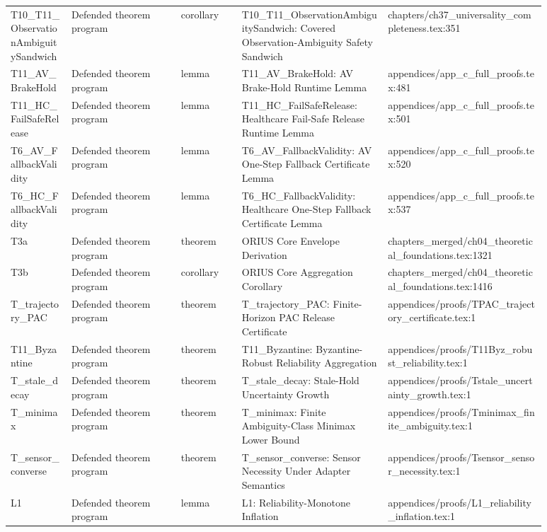 \begin{longtable}{p{0.10\linewidth}p{0.18\linewidth}p{0.10\linewidth}p{0.24\linewidth}p{0.26\linewidth}}
T10\_T11\_ObservationAmbiguitySandwich & Defended theorem program & corollary & T10\_T11\_ObservationAmbiguitySandwich: Covered Observation-Ambiguity Safety Sandwich & chapters/ch37\_universality\_completeness.tex:351 \\
T11\_AV\_BrakeHold & Defended theorem program & lemma & T11\_AV\_BrakeHold: AV Brake-Hold Runtime Lemma & appendices/app\_c\_full\_proofs.tex:481 \\
T11\_HC\_FailSafeRelease & Defended theorem program & lemma & T11\_HC\_FailSafeRelease: Healthcare Fail-Safe Release Runtime Lemma & appendices/app\_c\_full\_proofs.tex:501 \\
T6\_AV\_FallbackValidity & Defended theorem program & lemma & T6\_AV\_FallbackValidity: AV One-Step Fallback Certificate Lemma & appendices/app\_c\_full\_proofs.tex:520 \\
T6\_HC\_FallbackValidity & Defended theorem program & lemma & T6\_HC\_FallbackValidity: Healthcare One-Step Fallback Certificate Lemma & appendices/app\_c\_full\_proofs.tex:537 \\
T3a & Defended theorem program & theorem & ORIUS Core Envelope Derivation & chapters\_merged/ch04\_theoretical\_foundations.tex:1321 \\
T3b & Defended theorem program & corollary & ORIUS Core Aggregation Corollary & chapters\_merged/ch04\_theoretical\_foundations.tex:1416 \\
T\_trajectory\_PAC & Defended theorem program & theorem & T\_trajectory\_PAC: Finite-Horizon PAC Release Certificate & appendices/proofs/TPAC\_trajectory\_certificate.tex:1 \\
T11\_Byzantine & Defended theorem program & theorem & T11\_Byzantine: Byzantine-Robust Reliability Aggregation & appendices/proofs/T11Byz\_robust\_reliability.tex:1 \\
T\_stale\_decay & Defended theorem program & theorem & T\_stale\_decay: Stale-Hold Uncertainty Growth & appendices/proofs/Tstale\_uncertainty\_growth.tex:1 \\
T\_minimax & Defended theorem program & theorem & T\_minimax: Finite Ambiguity-Class Minimax Lower Bound & appendices/proofs/Tminimax\_finite\_ambiguity.tex:1 \\
T\_sensor\_converse & Defended theorem program & theorem & T\_sensor\_converse: Sensor Necessity Under Adapter Semantics & appendices/proofs/Tsensor\_sensor\_necessity.tex:1 \\
L1 & Defended theorem program & lemma & L1: Reliability-Monotone Inflation & appendices/proofs/L1\_reliability\_inflation.tex:1 \\

\end{longtable}
